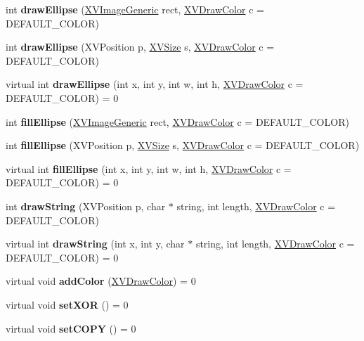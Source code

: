 \begin{CompactItemize}
\item 
int {\bf draw\-Ellipse} (\hyperlink{class_XVImageGeneric}{XVImage\-Generic} rect, \hyperlink{class_XVDrawColor}{XVDraw\-Color} c = DEFAULT\_\-COLOR)
\item 
int {\bf draw\-Ellipse} (XVPosition p, \hyperlink{class_XVSize}{XVSize} s, \hyperlink{class_XVDrawColor}{XVDraw\-Color} c = DEFAULT\_\-COLOR)
\item 
\label{XVDrawable_a12}
\hypertarget{class_XVDrawable_a12}{
virtual int {\bf draw\-Ellipse} (int x, int y, int w, int h, \hyperlink{class_XVDrawColor}{XVDraw\-Color} c = DEFAULT\_\-COLOR) = 0}

\item 
int {\bf fill\-Ellipse} (\hyperlink{class_XVImageGeneric}{XVImage\-Generic} rect, \hyperlink{class_XVDrawColor}{XVDraw\-Color} c = DEFAULT\_\-COLOR)
\item 
int {\bf fill\-Ellipse} (XVPosition p, \hyperlink{class_XVSize}{XVSize} s, \hyperlink{class_XVDrawColor}{XVDraw\-Color} c = DEFAULT\_\-COLOR)
\item 
\label{XVDrawable_a15}
\hypertarget{class_XVDrawable_a15}{
virtual int {\bf fill\-Ellipse} (int x, int y, int w, int h, \hyperlink{class_XVDrawColor}{XVDraw\-Color} c = DEFAULT\_\-COLOR) = 0}

\item 
int {\bf draw\-String} (XVPosition p, char $\ast$ string, int length, \hyperlink{class_XVDrawColor}{XVDraw\-Color} c = DEFAULT\_\-COLOR)
\item 
\label{XVDrawable_a17}
\hypertarget{class_XVDrawable_a17}{
virtual int {\bf draw\-String} (int x, int y, char $\ast$ string, int length, \hyperlink{class_XVDrawColor}{XVDraw\-Color} c = DEFAULT\_\-COLOR) = 0}

\item 
\label{XVDrawable_a18}
\hypertarget{class_XVDrawable_a18}{
virtual void {\bf add\-Color} (\hyperlink{class_XVDrawColor}{XVDraw\-Color}) = 0}

\item 
\label{XVDrawable_a19}
\hypertarget{class_XVDrawable_a19}{
virtual void {\bf set\-XOR} () = 0}

\item 
\label{XVDrawable_a20}
\hypertarget{class_XVDrawable_a20}{
virtual void {\bf set\-COPY} () = 0}

\end{CompactItemize}


